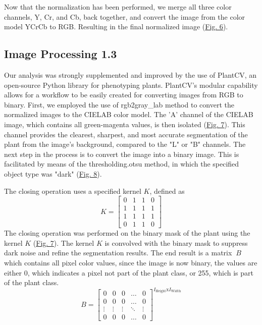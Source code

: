 \documentclass[12pt]{article}
\begin{document}
Now that the normalization has been performed, we merge all three color channels, Y, Cr, and Cb, back together, and convert the image from the color model YCrCb to RGB. Resulting in the final normalized image (\hyperref[fig:species_gaussdiff]{Fig. 6}).

\subsection*{Image Processing 1.3}
\hspace{1cm}Our analysis was strongly supplemented and improved by the use of PlantCV, an open-source Python library for phenotyping plants. PlantCV's modular capability allows for a workflow to be easily created for converting images from RGB to binary. First, we employed the use of rgb2gray\_lab method to convert the normalized images to the CIELAB color model. The 'A' channel of the CIELAB image, which contains all green-magenta values, is then isolated  (\hyperref[fig:species_lab]{Fig. 7}). This channel provides the clearest, sharpest, and most accurate segmentation of the plant from the image's background, compared to the "L" or "B" channels. The next step in the process is to convert the image into a binary image. This is facilitated by means of the thresholding.otsu method, in which the specified object type was "dark"  (\hyperref[fig:species_otsu]{Fig. 8}).

The closing operation uses a specified kernel \( K \), defined as
\begin{equation}
K = \begin{bmatrix}
0 & 1 & 1 & 0 \\
1 & 1 & 1 & 1 \\
1 & 1 & 1 & 1 \\
0 & 1 & 1 & 0
\end{bmatrix}
\end{equation}
The closing operation was performed on the binary mask of the plant using the kernel \( K \) (\hyperref[fig:species_closed]{Fig. 7}). The kernel \( K \) is convolved with the binary mask to suppress dark noise and refine the segmentation results. The end result is a matrix \(\ B \) which contains all pixel color values, since the image is now binary, the values are either 0, which indicates a pixel not part of the plant class, or 255, which is part of the plant class.
\begin{equation}
B = \begin{bmatrix}
0 & 0 & 0 & \dots  & 0\\
0 & 0 & 0 & \dots & 0\\
\vdots & \vdots & \vdots & \ddots & \vdots\\
0 & 0 & 0 & \dots & 0
\end{bmatrix} ^ {I_\text{Height}\text{x}I_\text{Width}}
\end{equation}
\end{document}
